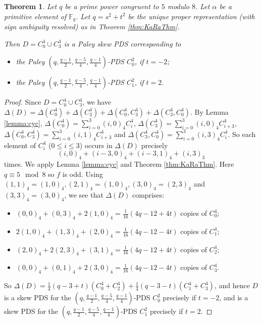 \documentclass[12pt, a4paper]{article}
\newtheorem{theorem}{Theorem}[section]
\theoremstyle{definition}
\begin{document}
\begin{theorem}\label{thm:C0C3}
Let $q$ be a prime power congruent to $5$ modulo $8$. Let $\alpha$ be a primitive element of $\mathbb{F}_q$. Let $q=s^2+t^2$ be the unique proper representation (with sign ambiguity resolved) as in Theorem \ref{thm:KaRaThm}. 

Then $D=C_0^4 \cup C_3^4$ is a Paley skew PDS corresponding to 
\begin{itemize}
\item[(i)] the Paley $(q,\frac{q-1}{2}, \frac{q-5}{4}, \frac{q-1}{4})$-PDS $C_0^2$, if $t=-2$;
\item[(ii)] the Paley $(q,\frac{q-1}{2}, \frac{q-5}{4}, \frac{q-1}{4})$-PDS $C_1^2$, if $t=2$.
\end{itemize}
\end{theorem}
\begin{proof}
Since $D=C_0^4 \cup C_3^4$, we have $\Delta(D)=\Delta(C_0^4)+\Delta(C_3^4)+\Delta(C_0^4,C_3^4)+\Delta(C_3^4,C_0^4)$.
By Lemma \ref{lemma:cyc}, $\Delta(C_0^4)=\sum_{i=0}^3 (i,0)_4 C_i^4$, $\Delta(C_3^4)=\sum_{i=0}^3 (i,0)_4 C_{i+3}^4$, $\Delta(C_0^4,C_3^4)=\sum_{i=0}^3 (i,1)_4 C_{i+3}^4$ and $\Delta(C_3^4,C_0^4)=\sum_{i=0}^3 (i,3)_4 C_i^4$. So each element of $C_i^4$ ($0 \leq i \leq 3$) occurs in $\Delta(D)$ precisely
$$ (i,0)_4 + (i-3,0)_4 + (i-3,1)_4 + (i,3)_3$$
times.  We apply Lemma \ref{lemma:cyc} and Theorem \ref{thm:KaRaThm}.  Here $q \equiv 5 \mod 8$ so $f$ is odd. Using $(1,1)_4=(1,0)_4, (2,1)_4=(1,0)_4, (3,0)_4=(2,3)_4$ and $(3,3)_4=(3,0)_4$, we see that $\Delta(D)$ comprises:
\begin{itemize}
\item $(0,0)_4+(0,3)_4+2(1,0)_4=\frac{1}{16}(4q-12+4t)$ copies of $C_0^4$;
\item $2(1,0)_4+(1,3)_4+(2,0)_4=\frac{1}{16}(4q-12-4t)$ copies of $C_1^4$;
\item $(2,0)_4+ 2(2,3)_4+(3,1)_4=\frac{1}{16}(4q-12
+4t)$ copies of $C_2^4$;
\item $(0,0)_4+(0,1)_4+2(3,0)_4=\frac{1}{16}(4q-12-4t)$ copies of $C_3^4$.
\end{itemize}
So $\Delta(D)=\frac{1}{4}(q-3+t)(C_0^4+C_2^4) + \frac{1}{4}(q-3-t)(C_1^4+C_3^4)$, and hence $D$ is a skew PDS for the $(q,\frac{q-1}{2}, \frac{q-5}{4}, \frac{q-1}{4})$-PDS $C_0^2$ precisely if $t=-2$, and is a skew PDS for the $(q,\frac{q-1}{2}, \frac{q-5}{4}, \frac{q-1}{4})$-PDS $C_1^2$ precisely if $t=2$.
\end{proof}
\end{document}
